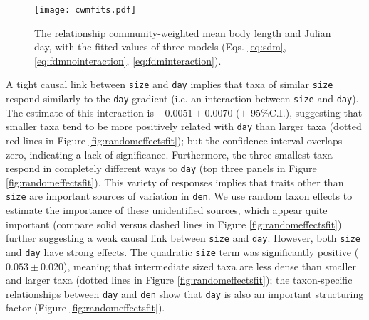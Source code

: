 \documentclass[12pt]{ecology}
\begin{document}
\begin{figure}
\texttt{[image: cwmfits.pdf]}
\caption{The relationship community-weighted mean body length and Julian day, with the fitted values of three models (Eqs. \ref{eq:sdm}, \ref{eq:fdmnointeraction}, \ref{eq:fdminteraction}).}%
\label{fig:cwmfits}
\end{figure}

A tight causal link between \texttt{size} and \texttt{day} implies that taxa of similar \texttt{size} respond similarly to the \texttt{day} gradient (i.e. an interaction between \texttt{size} and \texttt{day}).  The estimate of this interaction is $-0.0051 \pm 0.0070$ ($\pm$ 95\%C.I.), suggesting that smaller taxa tend to be more positively related with \texttt{day} than larger taxa (dotted red lines in Figure \ref{fig:randomeffectsfit}); but the confidence interval overlaps zero, indicating a lack of significance.  Furthermore, the three smallest taxa respond in completely different ways to \texttt{day} (top three panels in Figure \ref{fig:randomeffectsfit}).  This variety of responses implies that traits other than \texttt{size} are important sources of variation in \texttt{den}.  We use random taxon effects to estimate the importance of these unidentified sources, which appear quite important (compare solid versus dashed lines in Figure \ref{fig:randomeffectsfit}) further suggesting a weak causal link between \texttt{size} and \texttt{day}.  However, both \texttt{size} and \texttt{day} have strong effects.  The quadratic \texttt{size} term was significantly positive ($0.053 \pm 0.020$), meaning that intermediate sized taxa are less dense than smaller and larger taxa (dotted lines in Figure \ref{fig:randomeffectsfit}); the taxon-specific relationships between \texttt{day} and \texttt{den} show that \texttt{day} is also an important structuring factor (Figure \ref{fig:randomeffectsfit}).




\end{document}
